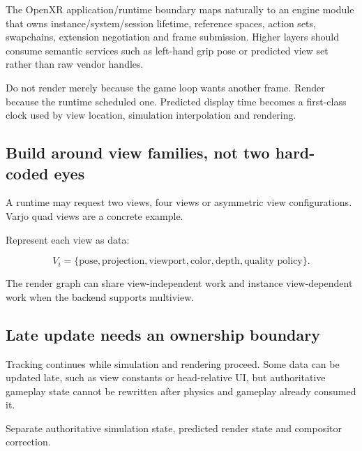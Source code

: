 \hypertarget{06-engine-ii-ch042-openxr-belongs-in-the-platform-layer}{}

The OpenXR application/runtime boundary maps naturally to an engine module that owns instance/system/session lifetime, reference spaces, action sets, swapchains, extension negotiation and frame submission. Higher layers should consume semantic services such as left-hand grip pose or predicted view set rather than raw vendor handles.

Do not render merely because the game loop wants another frame. Render because the runtime scheduled one. Predicted display time becomes a first-class clock used by view location, simulation interpolation and rendering.

\subsection{Build around view families, not two hard-coded eyes}\label{06-engine-ii-ch042-build-around-view-families-not-two-hard-coded-eyes}

\hypertarget{06-engine-ii-ch042-build-around-view-families-not-two-hard-coded-eyes}{}

A runtime may request two views, four views or asymmetric view configurations. Varjo quad views are a concrete example.

Represent each view as data:

\[
V_i=\{\text{pose},\text{projection},\text{viewport},
\text{color},\text{depth},\text{quality policy}\}.
\]

The render graph can share view-independent work and instance view-dependent work when the backend supports multiview.

\subsection{Late update needs an ownership boundary}\label{06-engine-ii-ch042-late-update-needs-an-ownership-boundary}

\hypertarget{06-engine-ii-ch042-late-update-needs-an-ownership-boundary}{}

Tracking continues while simulation and rendering proceed. Some data can be updated late, such as view constants or head-relative UI, but authoritative gameplay state cannot be rewritten after physics and gameplay already consumed it.

Separate authoritative simulation state, predicted render state and compositor correction.

